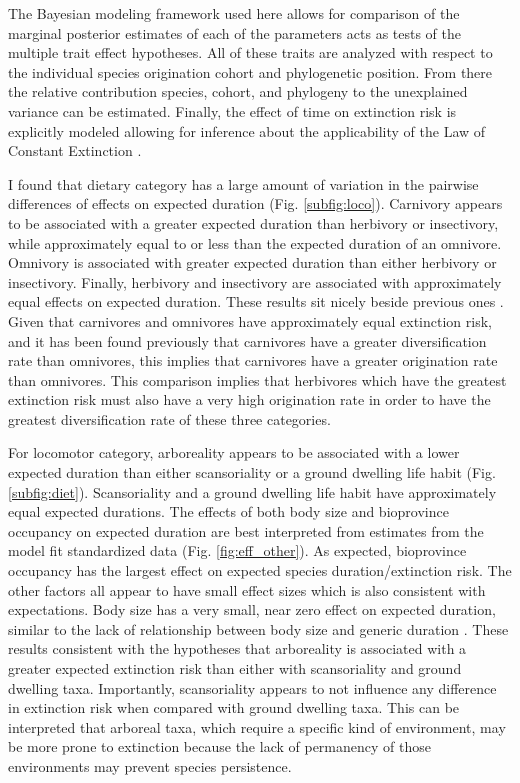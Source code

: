\documentclass{nature}
\begin{document}
The Bayesian modeling framework used here allows for comparison of the marginal posterior estimates of each of the parameters acts as tests of the multiple trait effect hypotheses. All of these traits are analyzed with respect to the individual species origination cohort and phylogenetic position. From there the relative contribution species, cohort, and phylogeny to the unexplained variance can be estimated. Finally, the effect of time on extinction risk is explicitly modeled allowing for inference about the applicability of the Law of Constant Extinction \cite{VanValen1973}.

I found that dietary category has a large amount of variation in the pairwise differences of effects on expected duration (Fig. \ref{subfig:loco}). Carnivory appears to be associated with a greater expected duration than herbivory or insectivory, while approximately equal to or less than the expected duration of an omnivore. Omnivory is associated with greater expected duration than either herbivory or insectivory. Finally, herbivory and insectivory are associated with approximately equal effects on expected duration. 
These results sit nicely beside previous ones \cite{Price2012}. Given that carnivores and omnivores have approximately equal extinction risk, and it has been found previously that carnivores have a greater diversification rate than omnivores, this implies that carnivores have a greater origination rate than omnivores. This comparison implies that herbivores which have the greatest extinction risk must also have a very high origination rate in order to have the greatest diversification rate of these three categories. 

For locomotor category, arboreality appears to be associated with a lower expected duration than either scansoriality or a ground dwelling life habit (Fig. \ref{subfig:diet}). Scansoriality and a ground dwelling life habit have approximately equal expected durations. The effects of both body size and bioprovince occupancy on expected duration are best interpreted from estimates from the model fit standardized data (Fig. \ref{fig:eff_other}). As expected, bioprovince occupancy has the largest effect on expected species duration/extinction risk. The other factors all appear to have small effect sizes which is also consistent with expectations. Body size has a very small, near zero effect on expected duration, similar to the lack of relationship between body size and generic duration \cite{Tomiya2013}. These results consistent with the hypotheses that arboreality is associated with a greater expected extinction risk than either with scansoriality and ground dwelling taxa. Importantly, scansoriality appears to not influence any difference in extinction risk when compared with ground dwelling taxa. This can be interpreted that arboreal taxa, which require a specific kind of environment, may be more prone to extinction because the lack of permanency of those environments may prevent species persistence. 
\end{document}
